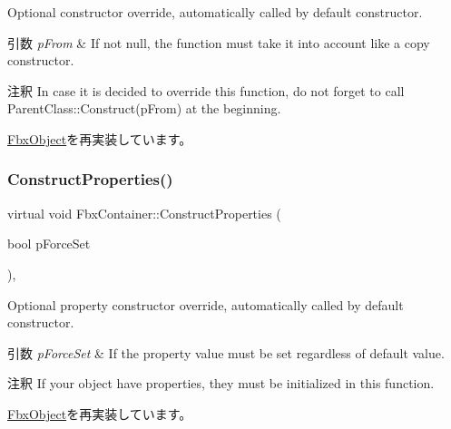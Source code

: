 Optional constructor override, automatically called by default constructor. 
\begin{DoxyParams}{引数}
{\em p\+From} & If not null, the function must take it into account like a copy constructor. \\
\hline
\end{DoxyParams}
\begin{DoxyRemark}{注釈}
In case it is decided to override this function, do not forget to call Parent\+Class\+::\+Construct(p\+From) at the beginning. 
\end{DoxyRemark}


\hyperlink{class_fbx_object_a313503bc645af3fdceb4a99ef5cea7eb}{Fbx\+Object}を再実装しています。

\mbox{\label{class_fbx_container_a27222c85d2076c036d1596c25cbc9cd0}} 
\subsubsection{\texorpdfstring{Construct\+Properties()}{ConstructProperties()}}
{\footnotesize\ttfamily virtual void Fbx\+Container\+::\+Construct\+Properties (\begin{DoxyParamCaption}\item[{bool}]{p\+Force\+Set }\end{DoxyParamCaption})\hspace{0.3cm}{\ttfamily [protected]}, {\ttfamily [virtual]}}

Optional property constructor override, automatically called by default constructor. 
\begin{DoxyParams}{引数}
{\em p\+Force\+Set} & If the property value must be set regardless of default value. \\
\hline
\end{DoxyParams}
\begin{DoxyRemark}{注釈}
If your object have properties, they must be initialized in this function. 
\end{DoxyRemark}


\hyperlink{class_fbx_object_ad44f814323dc1b5e78bff1bfc608b4bb}{Fbx\+Object}を再実装しています。

\mbox{\label{class_fbx_container_aba24a2e2319b0111980eb198f8e726b1}} 
